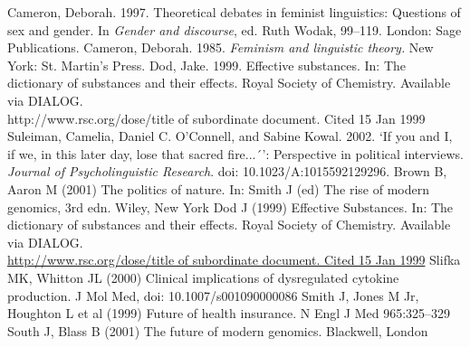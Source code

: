 \begin{thebibliography}{99.}
%
 Cameron, Deborah. 1997. Theoretical debates in feminist linguistics: Questions of sex and gender. In \textit{Gender and discourse}, ed. Ruth Wodak, 99--119. London: Sage Publications.
%
 Cameron, Deborah. 1985. \textit{Feminism and linguistic theory.} New York: St. Martin's Press.
%
 Dod, Jake. 1999. Effective substances. In: The dictionary of substances and their effects. Royal Society of Chemistry. Available via DIALOG. \\
http://www.rsc.org/dose/title of subordinate document. Cited 15 Jan 1999
%
 Suleiman, Camelia, Daniel C. O’Connell, and Sabine Kowal. 2002. `If you and I, if we, in this later day, lose that sacred fire...´': Perspective in political interviews. \textit{Journal of Psycholinguistic Research}. doi: 10.1023/A:1015592129296.
%
%
%
\bigskip
%
%
%
%
 Brown B, Aaron M (2001) The politics of nature. In: Smith J (ed) The rise of modern genomics, 3rd edn. Wiley, New York 
%
 Dod J (1999) Effective Substances. In: The dictionary of substances and their effects. Royal Society of Chemistry. Available via DIALOG. \\
\url{http://www.rsc.org/dose/title of subordinate document. Cited 15 Jan 1999}
%
 Slifka MK, Whitton JL (2000) Clinical implications of dysregulated cytokine production. J Mol Med, doi: 10.1007/s001090000086
%
 Smith J, Jones M Jr, Houghton L et al (1999) Future of health insurance. N Engl J Med 965:325--329
%
 South J, Blass B (2001) The future of modern genomics. Blackwell, London






















%
\end{thebibliography}

